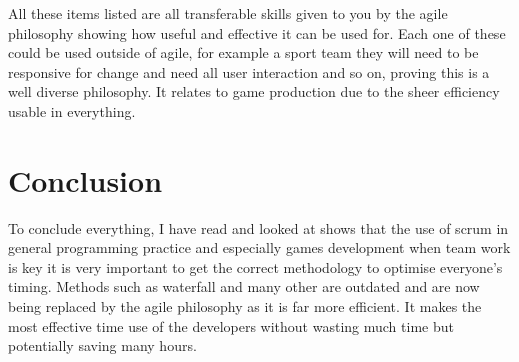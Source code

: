 \documentclass{scrartcl}
\begin{document}
All these items listed are all transferable skills given to you by the agile philosophy showing how useful and effective it can be used for. Each one of these could be used outside of agile, for example a sport team they will need to be responsive for change and need all user interaction and so on, proving this is a well diverse philosophy. It relates to game production due to the sheer efficiency usable in everything.

\section{Conclusion}
To conclude everything, I have read and looked at shows that the use of scrum in general programming practice and especially games development when team work is key it is very important to get the correct methodology to optimise everyone’s timing. Methods such as waterfall and many other are outdated and are now being replaced by the agile philosophy as it is far more efficient. It makes the most effective time use of the developers without wasting much time but potentially saving many hours.



\end{document}
